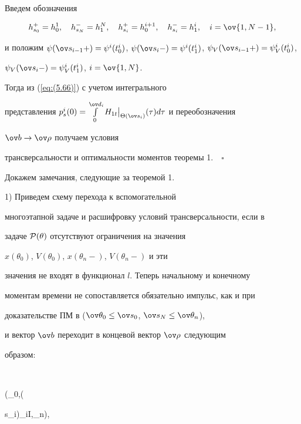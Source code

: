 Введем обозначения


$$


h_{s_0}^{+}=h_0^1,\quad


h_{s_N}^{-}=h_1^N,\quad h_{s_i}^{+}=h_0^{i+1},\quad


h_{s_i}^{-}=h_1^{i},\quad i=\ov{1,N-1},


$$


и положим $\psi(\ov s_{i-1}+)=\psi^{i}(t_0^i)$, $\psi(\ov s_i


-)=\psi^{i}(t_1^{i})$, $\psi_V(\ov s_{i-1}+)=\psi_V^{i}(t_0^i)$,


$\psi_V(\ov s_i -)=\psi_V^{i}(t_1^{i})$, $i=\ov{1,N}$.


Тогда из (\ref{eq:(5.66)}) с учетом интегрального


представления $p_s^i(0)=\int\limits_0^{\ov


d_i}H_{1t}\big|_{ \Theta(\ov s_i)}(\tau)d\tau$ и переобозначения


$\ov b\rightarrow \ov\rho$ получаем условия


трансверсальности и оптимальности моментов теоремы 1.$\quad\square$


\medskip





Докажем замечания, следующие за теоремой 1.





1) Приведем схему перехода к вспомогательной


многоэтапной задаче и расшифровку условий трансверсальности, если в


задаче ${\cal P}(\theta)$ отсутствуют ограничения на значения


$x(\theta_0)$, $V(\theta_0)$, $x(\theta_n-)$, $V(\theta_n-)$ и эти


значения не входят в функционал $l$. Теперь начальному и конечному


моментам времени не сопоставляется обязательно импульс, как и при


доказательстве ПМ в \cite{DS99} ($\ov\theta_0\leq \ov


s_0$, $\ov s_N\leq \ov \theta_n$),


и вектор $\ov b$ переходит в концевой вектор $\ov\rho$ следующим


образом:


$$


\ov\theta \rightarrow (\ov \theta_0,(\ov


s_i)_{i\in \ov I},\ov \theta_n),


